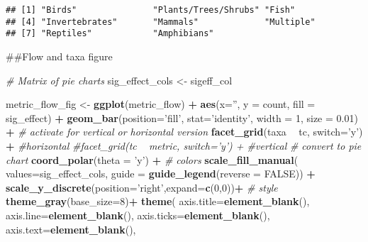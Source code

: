 \documentclass[
]{article}
\newenvironment{Shaded}{\begin{snugshade}}{\end{snugshade}}
\newcommand{\CommentTok}[1]{\textcolor[rgb]{0.56,0.35,0.01}{\textit{#1}}}
\newcommand{\DataTypeTok}[1]{\textcolor[rgb]{0.13,0.29,0.53}{#1}}
\newcommand{\DecValTok}[1]{\textcolor[rgb]{0.00,0.00,0.81}{#1}}
\newcommand{\FloatTok}[1]{\textcolor[rgb]{0.00,0.00,0.81}{#1}}
\newcommand{\KeywordTok}[1]{\textcolor[rgb]{0.13,0.29,0.53}{\textbf{#1}}}
\newcommand{\NormalTok}[1]{#1}
\newcommand{\OperatorTok}[1]{\textcolor[rgb]{0.81,0.36,0.00}{\textbf{#1}}}
\newcommand{\OtherTok}[1]{\textcolor[rgb]{0.56,0.35,0.01}{#1}}
\newcommand{\StringTok}[1]{\textcolor[rgb]{0.31,0.60,0.02}{#1}}
\begin{document}
\begin{verbatim}
## [1] "Birds"               "Plants/Trees/Shrubs" "Fish"               
## [4] "Invertebrates"       "Mammals"             "Multiple"           
## [7] "Reptiles"            "Amphibians"
\end{verbatim}

\#\#Flow and taxa figure

\begin{Shaded}
\begin{Highlighting}[]
\CommentTok{# Matrix of pie charts}
\NormalTok{  sig_effect_cols <-}\StringTok{ }\NormalTok{sigeff_col}

\NormalTok{  metric_flow_fig <-}\StringTok{ }\KeywordTok{ggplot}\NormalTok{(metric_flow) }\OperatorTok{+}
\StringTok{                    }\KeywordTok{aes}\NormalTok{(}\DataTypeTok{x=}\StringTok{''}\NormalTok{, }\DataTypeTok{y =}\NormalTok{ count, }\DataTypeTok{fill =}\NormalTok{ sig_effect) }\OperatorTok{+}
\StringTok{                    }\KeywordTok{geom_bar}\NormalTok{(}\DataTypeTok{position=}\StringTok{'fill'}\NormalTok{,}
                             \DataTypeTok{stat=}\StringTok{'identity'}\NormalTok{,}
                             \DataTypeTok{width =} \DecValTok{1}\NormalTok{,}
                             \DataTypeTok{size =} \FloatTok{0.01}\NormalTok{) }\OperatorTok{+}
\StringTok{                    }\CommentTok{# activate for vertical or horizontal version}
\StringTok{                      }\KeywordTok{facet_grid}\NormalTok{(taxa }\OperatorTok{~}\StringTok{ }\NormalTok{tc, }\DataTypeTok{switch=}\StringTok{'y'}\NormalTok{) }\OperatorTok{+}\StringTok{ }\CommentTok{#horizontal}
\StringTok{                      }\CommentTok{#facet_grid(tc ~ metric, switch='y') +  #vertical}
\StringTok{                    }\CommentTok{# convert to pie chart}
\StringTok{                      }\KeywordTok{coord_polar}\NormalTok{(}\DataTypeTok{theta =} \StringTok{'y'}\NormalTok{) }\OperatorTok{+}
\StringTok{                    }\CommentTok{# colors}
\StringTok{                      }\KeywordTok{scale_fill_manual}\NormalTok{(}
                        \DataTypeTok{values=}\NormalTok{sig_effect_cols,}
                        \DataTypeTok{guide =} \KeywordTok{guide_legend}\NormalTok{(}\DataTypeTok{reverse =} \OtherTok{FALSE}\NormalTok{))  }\OperatorTok{+}
\StringTok{                        }\KeywordTok{scale_y_discrete}\NormalTok{(}\DataTypeTok{position=}\StringTok{'right'}\NormalTok{,}\DataTypeTok{expand=}\KeywordTok{c}\NormalTok{(}\DecValTok{0}\NormalTok{,}\DecValTok{0}\NormalTok{))}\OperatorTok{+}
\StringTok{                    }\CommentTok{# style}
\StringTok{                      }\KeywordTok{theme_gray}\NormalTok{(}\DataTypeTok{base_size=}\DecValTok{8}\NormalTok{)}\OperatorTok{+}
\StringTok{                      }\KeywordTok{theme}\NormalTok{(}
                        \DataTypeTok{axis.title=}\KeywordTok{element_blank}\NormalTok{(),}
                        \DataTypeTok{axis.line=}\KeywordTok{element_blank}\NormalTok{(),}
                        \DataTypeTok{axis.ticks=}\KeywordTok{element_blank}\NormalTok{(),}
                        \DataTypeTok{axis.text=}\KeywordTok{element_blank}\NormalTok{(),}
                        

\end{Highlighting}
\end{Shaded}
\end{document}
